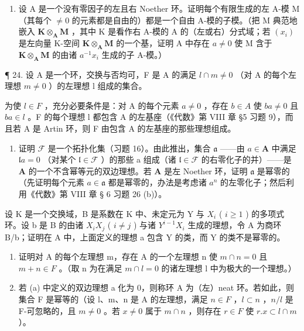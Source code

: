 \begin{enumerate}
\def\labelenumi{(\alph{enumi})}
\setcounter{enumi}{1}
\tightlist
\item
  设 A 是一个没有零因子的左且右 Noether 环。证明每个有限生成的左 A-模 M（其每个 \(\neq 0\) 的元素都是自由的）都是一个自由 A-模的子模。（把 M 典范地嵌入 \(\mathbf{K} \otimes_{\mathbf{A}} \mathbf{M}\) ，其中 K 是看作右 A-模的 A 的（左或右）分式域；若 \((x_{i})\) 是左向量 K-空间 \(\mathbf{K} \otimes_{\mathbf{A}} \mathbf{M}\) 的一个基，证明 A 中存在 \(a \neq 0\) 使 M 含于 \(\mathbf{K} \otimes_{\mathbf{A}} \mathbf{M}\) 的由诸 \(a^{-1}x_{i}\) 生成的子 A-模。）
\end{enumerate}

¶ 24. 设 A 是一个环，交换与否均可，F 是 A 的满足 \(l \cap m \neq 0\) （对 A 的每个左理想 \(m \neq 0\) ）的左理想 l 组成的集合。

为使 \(l \in F\) ，充分必要条件是：对 A 的每个元素 \(a \neq 0\) ，存在 \(b \in A\) 使 \(ba \neq 0\) 且 \(ba \in l\) 。F 的每个理想 l 都包含 A 的左基座（《代数》第 VIII 章 §5 习题 9），而且若 A 是 Artin 环，则 F 由包含 A 的左基座的那些理想组成。

\begin{enumerate}
\def\labelenumi{(\alph{enumi})}
\tightlist
\item
  证明 \(\mathcal{F}\) 是一个拓扑化集（习题 16）。由此推出，集合 \(\mathfrak{a}\) ——由 \(a \in \mathbf{A}\) 中满足 \(\mathfrak{l}a = 0\) （对某个 \(\mathfrak{l} \in \mathcal{F}\) ）的那些 a 组成（诸 \(\mathfrak{l} \in \mathcal{F}\) 的右零化子的并）——是 \(\mathbf{A}\) 的一个不含幂等元的双边理想。若 \(\mathbf{A}\) 是左 Noether 环，证明 \(\mathfrak{a}\) 是幂零的（先证明每个元素 \(a \in \mathfrak{a}\) 都是幂零的，办法是考虑诸 \(a^n\) 的左零化子；然后利用《代数》第 VIII 章 § 6 习题 26 (b)）。
\end{enumerate}

设 K 是一个交换域，B 是系数在 K 中、未定元为 Y 与 \(X_{i}\) ( \(i \geqslant 1\) ) 的多项式环。设 b 是 B 的由诸 \(X_{i}X_{j}\) ( \(i \neq j\) ) 与诸 \(Y^{i-1}X_{i}\) 生成的理想，令 A 为商环 B/b；证明在 A 中，上面定义的理想 a 包含 Y 的类，而 Y 的类不是幂零的。

\begin{enumerate}
\def\labelenumi{(\alph{enumi})}
\setcounter{enumi}{1}
\item
  证明对 A 的每个左理想 m，存在 A 的一个左理想 n 使 \(m \cap n = 0\) 且 \(m + n \in F\) 。（取 n 为在满足 \(m \cap l = 0\) 的诸左理想 l 中为极大的一个理想。）
\item
  若 (a) 中定义的双边理想 a 化为 0，则称环 A 为（左）neat 环。若如此，则集合 F 是幂等的（设 l、m、n 是 A 的左理想，满足 \(n \in F\) ，\(l \subset n\) ，\(n/l\) 是 F-可忽略的，且 \(m \neq 0\) 。若 \(x \neq 0\) 属于 \(m \cap n\) ，则存在 \(r \in F\) 使 \(r.x \subset l \cap m\) ）。
\end{enumerate}

